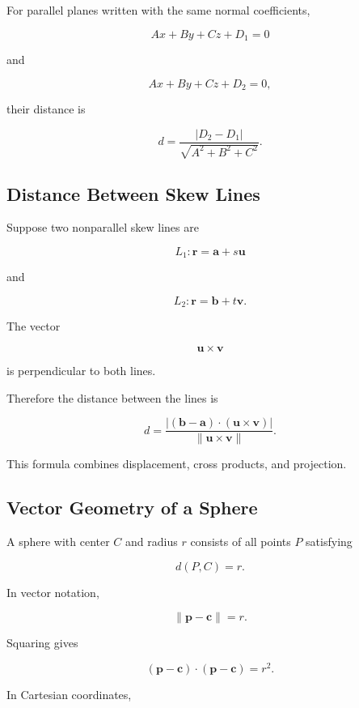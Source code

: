 For parallel planes written with the same normal coefficients,

\[
Ax+By+Cz+D_1=0
\]

and

\[
Ax+By+Cz+D_2=0,
\]

their distance is

\[
\boxed{
d=
\frac{|D_2-D_1|}
{\sqrt{A^2+B^2+C^2}}.
}
\]

\subsection{Distance Between Skew Lines}
\label{subsec:distance-skew-lines}

Suppose two nonparallel skew lines are

\[
L_1:\mathbf{r}=\mathbf{a}+s\mathbf{u}
\]

and

\[
L_2:\mathbf{r}=\mathbf{b}+t\mathbf{v}.
\]

The vector

\[ \mathbf{u}\times\mathbf{v} \]

is perpendicular to both lines.

Therefore the distance between the lines is

\[
\boxed{
d=
\frac{
|(\mathbf{b}-\mathbf{a})\cdot(\mathbf{u}\times\mathbf{v})|
}{
\|\mathbf{u}\times\mathbf{v}\|
}.
}
\]

This formula combines displacement, cross products, and projection.

\subsection{Vector Geometry of a Sphere}
\label{subsec:vector-geometry-sphere}

A sphere with center \(C\) and radius \(r\) consists of all points \(P\)
satisfying

\[ d(P,C)=r. \]

In vector notation,

\[ \boxed{\|\mathbf{p}-\mathbf{c}\|=r.} \]

Squaring gives

\[ \boxed{(\mathbf{p}-\mathbf{c})\cdot(\mathbf{p}-\mathbf{c})=r^2.} \]

In Cartesian coordinates,

